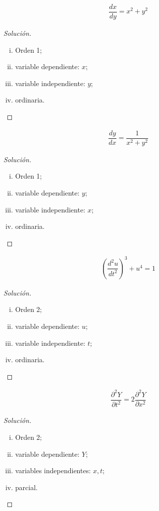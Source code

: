 {}
	\begin{align}
		\dfrac{dx}{dy}= x^{2}+y^{2}
	\end{align} 
	\begin{proof}[Solución]
		\begin{enumerate}[(i)]
			\item Orden 1; 
			\item variable dependiente: $ x $; 
			\item variable independiente: $ y $; 
			\item ordinaria.
		\end{enumerate}
	\end{proof}

{}
	\begin{align}
	\dfrac{dy}{dx}= \dfrac{1}{x^{2}+y^{2}}
	\end{align} 
	\begin{proof}[Solución]
		\begin{enumerate}[(i)]
			\item Orden 1; 
			\item variable dependiente: $ y $; 
			\item variable independiente: $ x $; 
			\item ordinaria.
		\end{enumerate}
	\end{proof}

{}
	\begin{align}
	\left(\dfrac{d^{2}u}{dt^{2}}\right)^{3}+u^{4}=1
	\end{align} 
	\begin{proof}[Solución]
		\begin{enumerate}[(i)]
			\item Orden 2; 
			\item variable dependiente: $ u $; 
			\item variable independiente: $ t $; 
			\item ordinaria.
		\end{enumerate}
	\end{proof}


{}
	\begin{align}
	\dfrac{\partial^{2}Y}{\partial t^{2}} = 2\dfrac{\partial^{2}Y}{\partial x^{2}}
	\end{align} 
	\begin{proof}[Solución]
		\begin{enumerate}[(i)]
			\item Orden 2; 
			\item variable dependiente: $ Y $; 
			\item variables independientes: $ x,t $; 
			\item parcial.
		\end{enumerate}
	\end{proof}

